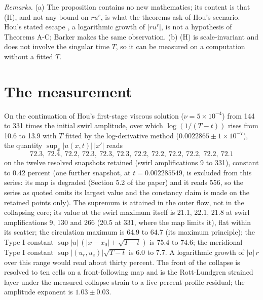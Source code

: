 \documentclass[11pt]{article}
\newcommand{\sn}[2]{#1\times 10^{#2}}
\begin{document}
\medskip
\emph{Remarks.} (a) The proposition contains no new mathematics; its content is that (H), and not any bound on $r u^r$, is what the theorems ask of Hou's scenario. Hou's stated escape \cite[Sec. 1.5]{H24}, a logarithmic growth of $|r u^r|$, is not a hypothesis of Theorems A-C; Barker \cite{B25} makes the same observation. (b) (H) is scale-invariant and does not involve the singular time $T$, so it can be measured on a computation without a fitted $T$.

\section{The measurement}

On the continuation of Hou's first-stage viscous solution ($\nu = \sn{5}{-4}$) from 144 to 331 times the initial swirl amplitude, over which $\log(1 / (T - t))$ rises from 10.6 to 13.9 with $T$ fitted by the log-derivative method ($0.0022865 \pm \sn{1}{-7}$), the quantity $\sup_x |u(x, t)|\,|x'|$ reads
\[
72.3,\ 72.4,\ 72.2,\ 72.3,\ 72.3,\ 72.3,\ 72.2,\ 72.2,\ 72.2,\ 72.2,\ 72.2,\ 72.1
\]
on the twelve resolved snapshots retained (swirl amplifications 9 to 331), constant to 0.42 percent (one further snapshot, at $t = 0.002285549$, is excluded from this series: its map is degraded (Section 5.2 of the paper) and it reads 556, so the series as quoted omits its largest value and the constancy claim is made on the retained points only). The supremum is attained in the outer flow, not in the collapsing core; its value at the swirl maximum itself is 21.1, 22.1, 21.8 at swirl amplifications 9, 130 and 266 (20.5 at 331, where the map limits it), flat within its scatter; the circulation maximum is 64.9 to 64.7 (its maximum principle); the Type I constant $\sup |u|\,(|x - x_0| + \sqrt{T - t})$ is 75.4 to 74.6; the meridional Type I constant $\sup |(u_r, u_z)| \sqrt{T - t}$ is 6.0 to 7.7. A logarithmic growth of $|u|\, r$ over this range would read about thirty percent. The front of the collapse is resolved to ten cells on a front-following map and is the Rott-Lundgren strained layer under the measured collapse strain to a five percent profile residual; the amplitude exponent is $1.03 \pm 0.03$.
\end{document}
